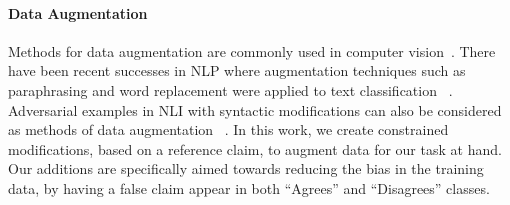 \documentclass[letterpaper]{article} %
\begin{document}
\paragraph{Data Augmentation}
Methods for data augmentation are commonly used in computer vision~\cite{perez2017effectiveness}. There have been recent successes in NLP where augmentation techniques such as paraphrasing and word replacement were applied to text classification ~\cite{kobayashi2018contextual,wu2018conditional}. Adversarial examples in NLI with syntactic modifications can also be considered as methods of data augmentation ~\cite{iyyer-etal-2018-adversarial,zhang2019paws}.
 In this work, we create constrained modifications, based on a reference claim, to augment data for our task at hand. Our additions are specifically aimed towards reducing the bias in the training data, by having a false claim appear in both ``Agrees'' and ``Disagrees'' classes.



\end{document}
